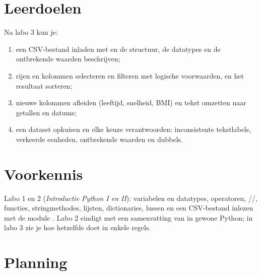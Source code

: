 \documentclass[11pt,a4paper]{article}
\begin{document}



\section{Leerdoelen}

Na labo 3 kun je:

\begin{enumerate}[label=\textbf{LD\arabic*}, leftmargin=1.4cm]
  \item een CSV-bestand inladen met  en de structuur, de
        datatypes en de ontbrekende waarden beschrijven;
  \item rijen en kolommen selecteren en filteren met logische
        voorwaarden, en het resultaat sorteren;
  \item nieuwe kolommen afleiden (leeftijd, snelheid, BMI) en tekst
        omzetten naar getallen en datums;
  \item een dataset opkuisen en elke keuze verantwoorden: inconsistente
        tekstlabels, verkeerde eenheden, ontbrekende waarden en dubbels.
\end{enumerate}

\section{Voorkennis}

Labo 1 en 2 (\emph{Introductie Python I en II}): variabelen en datatypes,
operatoren, //, functies,
stringmethodes, lijsten, dictionaries, lussen en een CSV-bestand inlezen
met de module . Labo 2 eindigt met een samenvatting van
 in gewone Python; in labo 3 zie je hoe 
hetzelfde doet in enkele regels.





\section{Planning}
\end{document}
